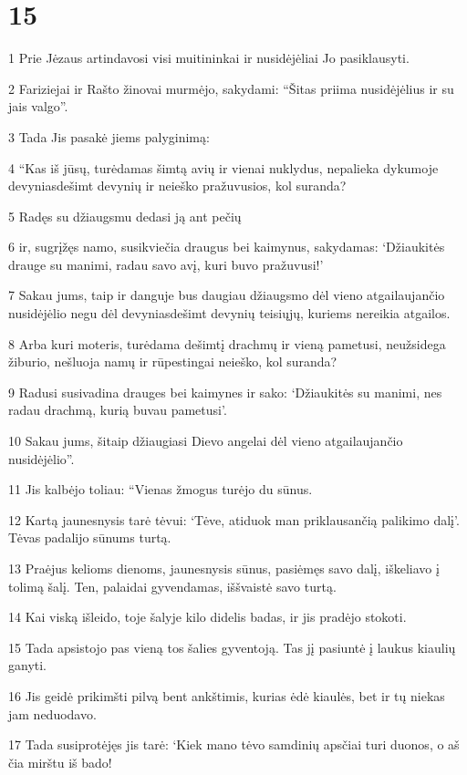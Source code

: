 \chapter{15}


\par 1 Prie Jėzaus artindavosi visi muitininkai ir nusidėjėliai Jo pasiklausyti. 
\par 2 Fariziejai ir Rašto žinovai murmėjo, sakydami: “Šitas priima nusidėjėlius ir su jais valgo”. 
\par 3 Tada Jis pasakė jiems palyginimą: 
\par 4 “Kas iš jūsų, turėdamas šimtą avių ir vienai nuklydus, nepalieka dykumoje devyniasdešimt devynių ir neieško pražuvusios, kol suranda? 
\par 5 Radęs su džiaugsmu dedasi ją ant pečių 
\par 6 ir, sugrįžęs namo, susikviečia draugus bei kaimynus, sakydamas: ‘Džiaukitės drauge su manimi, radau savo avį, kuri buvo pražuvusi!’ 
\par 7 Sakau jums, taip ir danguje bus daugiau džiaugsmo dėl vieno atgailaujančio nusidėjėlio negu dėl devyniasdešimt devynių teisiųjų, kuriems nereikia atgailos. 
\par 8 Arba kuri moteris, turėdama dešimtį drachmų ir vieną pametusi, neužsidega žiburio, nešluoja namų ir rūpestingai neieško, kol suranda? 
\par 9 Radusi susivadina drauges bei kaimynes ir sako: ‘Džiaukitės su manimi, nes radau drachmą, kurią buvau pametusi’. 
\par 10 Sakau jums, šitaip džiaugiasi Dievo angelai dėl vieno atgailaujančio nusidėjėlio”. 
\par 11 Jis kalbėjo toliau: “Vienas žmogus turėjo du sūnus. 
\par 12 Kartą jaunesnysis tarė tėvui: ‘Tėve, atiduok man priklausančią palikimo dalį’. Tėvas padalijo sūnums turtą. 
\par 13 Praėjus kelioms dienoms, jaunesnysis sūnus, pasiėmęs savo dalį, iškeliavo į tolimą šalį. Ten, palaidai gyvendamas, iššvaistė savo turtą. 
\par 14 Kai viską išleido, toje šalyje kilo didelis badas, ir jis pradėjo stokoti. 
\par 15 Tada apsistojo pas vieną tos šalies gyventoją. Tas jį pasiuntė į laukus kiaulių ganyti. 
\par 16 Jis geidė prikimšti pilvą bent ankštimis, kurias ėdė kiaulės, bet ir tų niekas jam neduodavo. 
\par 17 Tada susiprotėjęs jis tarė: ‘Kiek mano tėvo samdinių apsčiai turi duonos, o aš čia mirštu iš bado! 
